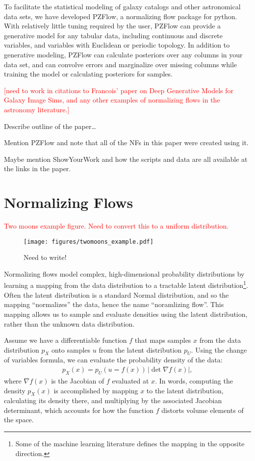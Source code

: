 \documentclass[twocolumn]{aastex631}
\newcommand{\note}[1]{\textsf{\textcolor{red}{#1}}}
\newcommand{\px}{p^{}_{X}}
\newcommand{\pu}{p^{}_{U}}
\begin{document}
To facilitate the statistical modeling of galaxy catalogs and other astronomical data sets, we have developed PZFlow, a normalizing flow package for python.
With relatively little tuning required by the user, PZFlow can provide a generative model for any tabular data, including continuous and discrete variables, and variables with Euclidean or periodic topology.
In addition to generative modeling, PZFlow can calculate posteriors over any columns in your data set, and can convolve errors and marginalize over missing columns while training the model or calculating posteriors for samples.

\note{[need to work in citations to Francois' paper on Deep Generative Models for Galaxy Image Sims, and any other examples of normalizing flows in the astronomy literature.]}

Describe outline of the paper\dots

Mention PZFlow and note that all of the NFs in this paper were created using it.

Maybe mention ShowYourWork and how the scripts and data are all available at the links in the paper.


\section{Normalizing Flows}
\label{sec:nf}

\note{Two moons example figure. Need to convert this to a uniform distribution.}
\begin{figure*}[t!]
    \begin{centering}
        \texttt{[image: figures/twomoons\_example.pdf]}
        \caption{
            Need to write!
        }
        \label{fig:two-moons}
    \end{centering}
\end{figure*}

Normalizing flows model complex, high-dimensional probability distributions by learning a mapping from the data distribution to a tractable latent distribution\footnote{Some of the machine learning literature defines the mapping in the opposite direction.}.
Often the latent distribution is a standard Normal distribution, and so the mapping ``normalizes'' the data, hence the name ``noramlizing flow''.
This mapping allows us to sample and evaluate densities using the latent distribution, rather than the unknown data distribution.

Assume we have a differentiable function $f$ that maps samples $x$ from the data distribution $\px$ onto samples $u$ from the latent distribution $\pu$.
Using the change of variables formula, we can evaluate the probability density of the data:
\begin{align}
    \px(x) = \pu(u=f(x)) \, |\det \nabla f(x)|,
    \label{eq:px}
\end{align}
where $\nabla f(x)$ is the Jacobian of $f$ evaluated at $x$.
In words, computing the density $\px(x)$ is accomplished by mapping $x$ to the latent distribution, calculating its density there, and multiplying by the associated Jacobian determinant, which accounts for how the function $f$ distorts volume elements of the space.
\end{document}
